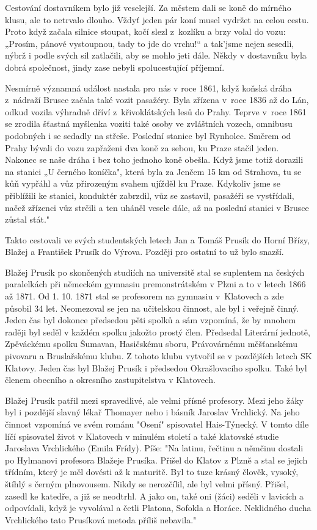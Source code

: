 \documentclass[../dejiny-rodu-prusiku.tex]{subfiles}
\begin{document}
Cestování dostavníkem bylo již veselejší. Za městem dali se koně do mírného klusu, ale to netrvalo dlouho. Vždyť  jeden pár koní musel vydržet na celou cestu. Proto když začala silnice stoupat, kočí slezl z kozlíku a brzy volal do vozu: „Prosím, pánové vystoupnou, tady to jde do vrchu!“ a tak'jsme nejen sesedli, nýbrž i podle svých sil zatlačili, aby se mohlo jeti dále. Někdy v dostav­níku byla dobrá společnost, jindy zase nebyli spolucestující příjemní.

Nesmírně významná událost nastala pro nás v roce 1861, když koňská dráha z nádraží  Brusce začala také vozit pasažéry. Byla zřízena v roce 1836 až do Lán, odkud vozila výhradně dříví z křivoklátských lesů  do Prahy. Teprve v roce 1861 se zrodila šťastná myšlenka voziti také osoby ve zvláštních vozech, omnibusu podobných i se sedadly na střeše. Poslední stanice byl Rynholec. Směrem od Prahy bývali do vozu zapřaženi dva koně za sebou, ku Praze stačil jeden. Nakonec se naše dráha i bez toho jednoho koně obešla. Když jsme totiž dorazili na stanici
„U černého koníčka", která byla za Jenčem 15 km od Strahova, tu se kůň vypřáhl a vůz přirozeným svahem ujížděl ku Praze. Kdykoliv jsme se přiblížili ke stanici, konduktér zabrzdil, vůz se zastavil, pasažéři se vystřídali, načež zřízenci vůz strčili a ten uháněl vesele dále, až na poslední stanici v Brusce zůstal stát."

Takto cestovali ve svých studentských letech Jan a Tomáš Prusík do Horní Břízy, Blažej a František Prusík do Vý­rova. Později pro ostatní to už bylo snazší.

Blažej Prusík po skončených studiích na universitě stal se suplentem na českých paralelkách při německém gymna­siu premonstrátském v Plzni a to v letech 1866 až 1871. Od 1. 10. 1871 stal se profesorem na gymnasiu v Klatovech a zde působil 34 let. Neomezoval se jen na učitelskou činnost, ale byl i veřejně činný. Jeden čas byl dokonce předsedou pěti spolků a sám vzpomíná, že by mnohem raději byl seděl v každém spolku jakožto prostý člen. Předsedal Literární jednotě, Zpěváckému spolku Šumavan, Hasičskému sboru, Právovárnému měšťanskému pivovaru a Bruslařskému klubu. Z tohoto klubu vytvořil se v pozdějších letech SK Klatovy. Jeden čas byl Blažej Prusík i předsedou Okrašlovacího spolku. Také byl členem obecního a okresního zastupitelstva v Klatovech.

Blažej Prusík patřil mezi spravedlivé, ale velmi přísné profesory. Mezi jeho žáky byl i pozdější slavný lékař Thomayer nebo i básník Jaroslav Vrchlický. Na jeho činnost vzpomíná ve svém románu "Osení" spisovatel Hais-Týnecký. V tomto díle líčí spisovatel život v Klatovech v minu­lém století a také klatovské studie Jaroslava Vrchlického (Emila Frídy). Píše: "Na latinu, řečtinu a němčinu dostali po Hylmanovi profesora Blažeje Prusíka. Přišel do Klatov z Plzně a stal se jejich třídním, který je měl dovésti až k maturitě. Byl to tuze krásný člověk, vysoký, štíhlý s černým plnovousem. Nikdy se nerozčílil, ale byl velmi přísný. Přišel, zasedl ke katedře, a již se neodtrhl. A jako on, také oni (žáci) seděli v lavicích a odpovídali, když je vyvolával a četli Platona, Sofokla a Horáce. Neklidného ducha Vrchlického tato Prusíková metoda příliš nebavila."
\end{document}
